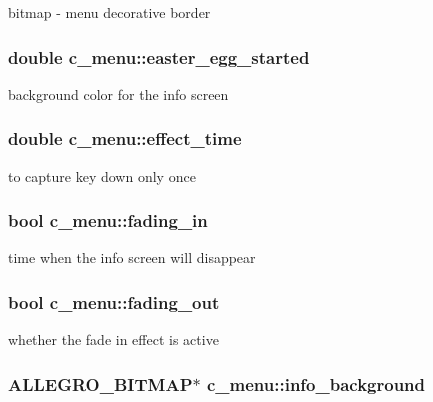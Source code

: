bitmap -\/ menu decorative border \hypertarget{classc__menu_af9c750db5db9b548d4d936e30dfe314f}{
\subsubsection[{easter\-\_\-egg\-\_\-started}]{\setlength{\rightskip}{0pt plus 5cm}double c\-\_\-menu\-::easter\-\_\-egg\-\_\-started\hspace{0.3cm}{\ttfamily [protected]}}}\label{classc__menu_af9c750db5db9b548d4d936e30dfe314f}
background color for the info screen \hypertarget{classc__menu_ae035b1a97b2334a285e3db7e00b0bdac}{
\subsubsection[{effect\-\_\-time}]{\setlength{\rightskip}{0pt plus 5cm}double c\-\_\-menu\-::effect\-\_\-time\hspace{0.3cm}{\ttfamily [protected]}}}\label{classc__menu_ae035b1a97b2334a285e3db7e00b0bdac}
to capture key down only once \hypertarget{classc__menu_ae983a894c3afee8671ed9f0fefd1b6a9}{
\subsubsection[{fading\-\_\-in}]{\setlength{\rightskip}{0pt plus 5cm}bool c\-\_\-menu\-::fading\-\_\-in\hspace{0.3cm}{\ttfamily [protected]}}}\label{classc__menu_ae983a894c3afee8671ed9f0fefd1b6a9}
time when the info screen will disappear \hypertarget{classc__menu_a72afb1bd10e583b642922b2a3b1d799b}{
\subsubsection[{fading\-\_\-out}]{\setlength{\rightskip}{0pt plus 5cm}bool c\-\_\-menu\-::fading\-\_\-out\hspace{0.3cm}{\ttfamily [protected]}}}\label{classc__menu_a72afb1bd10e583b642922b2a3b1d799b}
whether the fade in effect is active \hypertarget{classc__menu_a2898c943cc19bc36d9cb3763b9dc3c03}{
\subsubsection[{info\-\_\-background}]{\setlength{\rightskip}{0pt plus 5cm}A\-L\-L\-E\-G\-R\-O\-\_\-\-B\-I\-T\-M\-A\-P$\ast$ c\-\_\-menu\-::info\-\_\-background\hspace{0.3cm}{\ttfamily [protected]}}}\label{classc__menu_a2898c943cc19bc36d9cb3763b9dc3c03}
